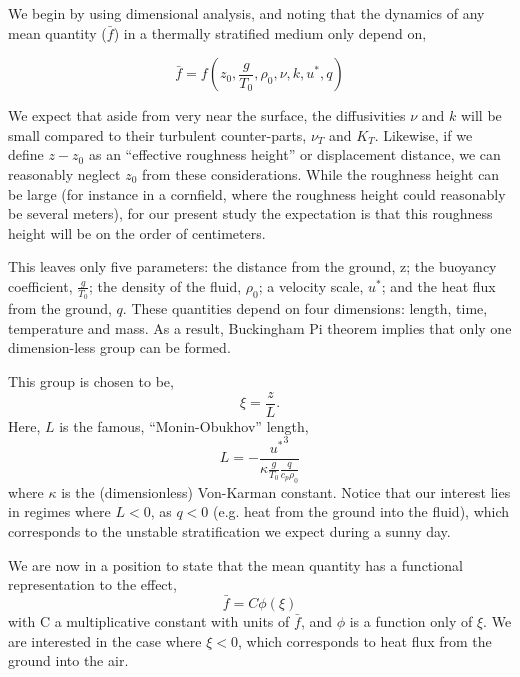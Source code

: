 %
%

We begin by using dimensional analysis, and noting that the dynamics of
any mean quantity ($\bar f$) in a thermally stratified medium only depend on,

\begin{equation}
\bar f = f(z_0,\frac{g}{T_0},\rho_0,\nu,k,u^*,q)
\end{equation}

We expect that aside from very near the surface, the diffusivities $\nu$
and $k$ will be small compared to their turbulent counter-parts, $\nu_T$
and $K_T$. Likewise, if we define $z-z_0$ as an ``effective roughness
height'' or displacement distance, we can reasonably neglect $z_0$ from these
considerations. While the roughness height can be large (for instance in
a cornfield, where the roughness height could reasonably be several
meters), for our present study the expectation is that this roughness
height will be on the order of centimeters\cite{}. 

This leaves only five parameters: the distance from the ground, z; the
buoyancy coefficient, $\frac{g}{T_0}$; the density of the fluid,
$\rho_0$; a velocity scale, $u^*$; and the heat flux from the ground,
$q$. 
%
% 
These quantities depend on
four dimensions: length, time, temperature and mass. As a result, 
Buckingham Pi theorem implies that only one dimension-less group can be
formed\cite{munson2012fundamentals}.%

This group is chosen to be,
\begin{equation}
 \xi = \frac{z}{L}.
\end{equation}
Here, $L$ is the famous, ``Monin-Obukhov'' length,
\begin{equation}
 L = -\frac{{u^*}^3}{\kappa \frac{g}{T_0} \frac{q}{c_p \rho_0}}
\end{equation}
where $\kappa$ is the (dimensionless) Von-Karman constant. Notice that
our interest lies in regimes where $L<0$, as $q<0$ (e.g. heat from the
ground into the fluid), which corresponds to the unstable stratification 
we expect during a sunny day. 

We are now in a position to state that the mean quantity has a
functional representation to the effect,
\begin{equation}
 \bar f = C \phi(\xi)
\end{equation}
with C a multiplicative constant with units of $\bar f$, and $\phi$ is a
function only of $\xi$. We are interested in the case where $\xi<0$, which
corresponds to heat flux from the ground into the air.  

